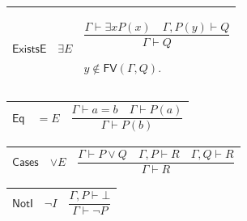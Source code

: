 \documentclass[11pt]{amsart}
\newlength{\FTCThreeColumnBody}
\begin{document}
{\noindent
\begin{tabular}{|@{}>{\centering\arraybackslash}m{0.176056\FTCThreeColumnBody}|>{\centering\arraybackslash}m{0.225352\FTCThreeColumnBody}|>{\centering\arraybackslash}m{0.598591\FTCThreeColumnBody}|}\hline
\hypertarget{rule:ExistsE}{$\displaystyle \textsf{ExistsE}$} & $\displaystyle \exists E$ & \rule[-3.3ex]{0pt}{7.8ex}$\displaystyle \dfrac{\Gamma\vdash\exists xP(x)\quad\Gamma,P(y)\vdash Q}{\Gamma\vdash Q}$\par
$\displaystyle y\notin\textsf{FV}(\Gamma,Q).$\\ \hline
\end{tabular}%
\par\setlength{\parskip}{0pt}\nointerlineskip
\noindent
\begin{tabular}{|@{}>{\centering\arraybackslash}m{0.176056\FTCThreeColumnBody}|>{\centering\arraybackslash}m{0.225352\FTCThreeColumnBody}|>{\centering\arraybackslash}m{0.598591\FTCThreeColumnBody}|}\hline
\hypertarget{rule:Eq}{$\displaystyle \textsf{Eq}$} & $\displaystyle =E$ & \rule[-3.3ex]{0pt}{7.8ex}$\displaystyle \dfrac{\Gamma\vdash a=b\quad\Gamma\vdash P(a)}{\Gamma\vdash P(b)}$\\ \hline
\end{tabular}%
\par\setlength{\parskip}{0pt}\nointerlineskip
\noindent
\begin{tabular}{|@{}>{\centering\arraybackslash}m{0.176056\FTCThreeColumnBody}|>{\centering\arraybackslash}m{0.225352\FTCThreeColumnBody}|>{\centering\arraybackslash}m{0.598591\FTCThreeColumnBody}|}\hline
\hypertarget{rule:Cases}{$\displaystyle \textsf{Cases}$} & $\displaystyle \vee E$ & \rule[-3.3ex]{0pt}{7.8ex}$\displaystyle \dfrac{\Gamma\vdash P\lor Q\quad\Gamma,P\vdash R\quad\Gamma,Q\vdash R}{\Gamma\vdash R}$\\ \hline
\end{tabular}%
\par\setlength{\parskip}{0pt}\nointerlineskip
\noindent
\begin{tabular}{|@{}>{\centering\arraybackslash}m{0.176056\FTCThreeColumnBody}|>{\centering\arraybackslash}m{0.225352\FTCThreeColumnBody}|>{\centering\arraybackslash}m{0.598591\FTCThreeColumnBody}|}\hline
\hypertarget{rule:NotI}{$\displaystyle \textsf{NotI}$} & $\displaystyle \neg I$ & \rule[-3.3ex]{0pt}{7.8ex}$\displaystyle \dfrac{\Gamma,P\vdash\bot}{\Gamma\vdash\neg P}$\\ \hline
\end{tabular}%
\par\setlength{\parskip}{0pt}\nointerlineskip
}
\end{document}
